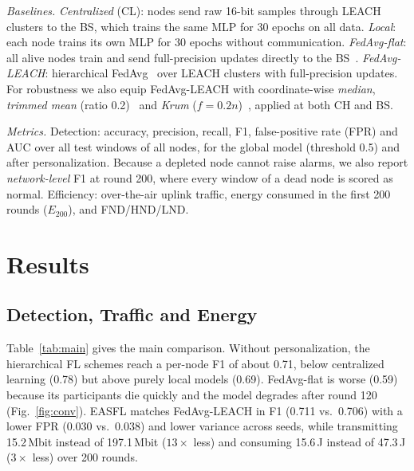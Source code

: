 \documentclass[journal]{IEEEtran}
\begin{document}
\textit{Baselines.} \emph{Centralized} (CL): nodes send raw 16-bit samples through LEACH clusters to the BS, which trains the same MLP for 30 epochs on all data. \emph{Local}: each node trains its own MLP for 30 epochs without communication. \emph{FedAvg-flat}: all alive nodes train and send full-precision updates directly to the BS~\cite{mcmahan2017}. \emph{FedAvg-LEACH}: hierarchical FedAvg~\cite{liu2020hfl} over LEACH clusters with full-precision updates. For robustness we also equip FedAvg-LEACH with coordinate-wise \emph{median}, \emph{trimmed mean} (ratio 0.2)~\cite{yin2018} and \emph{Krum} ($f=0.2n$)~\cite{blanchard2017}, applied at both CH and BS.

\textit{Metrics.} Detection: accuracy, precision, recall, F1, false-positive rate (FPR) and AUC over all test windows of all nodes, for the global model (threshold 0.5) and after personalization. Because a depleted node cannot raise alarms, we also report \emph{network-level} F1 at round 200, where every window of a dead node is scored as normal. Efficiency: over-the-air uplink traffic, energy consumed in the first 200 rounds ($E_{200}$), and FND/HND/LND.

\section{Results}\label{sec:results}
\subsection{Detection, Traffic and Energy}
Table~\ref{tab:main} gives the main comparison. Without personalization, the hierarchical FL schemes reach a per-node F1 of about 0.71, below centralized learning (0.78) but above purely local models (0.69). FedAvg-flat is worse (0.59) because its participants die quickly and the model degrades after round 120 (Fig.~\ref{fig:conv}). EASFL matches FedAvg-LEACH in F1 (0.711 vs.\ 0.706) with a lower FPR (0.030 vs.\ 0.038) and lower variance across seeds, while transmitting 15.2\,Mbit instead of 197.1\,Mbit ($13\times$ less) and consuming 15.6\,J instead of 47.3\,J ($3\times$ less) over 200 rounds.
\end{document}
